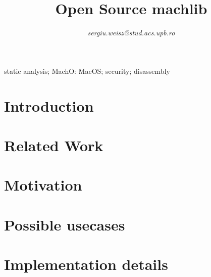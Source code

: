 \documentclass[10pt, conference, compsocconf]{IEEEtran}
\begin{document}
\title{Open Source machlib}

\author{
\emph{sergiu.weisz@stud.acs.upb.ro}
}

\maketitle


\begin{abstract}
  
\end{abstract}

\begin{IEEEkeywords}
static analysis; MachO: MacOS; security; disassembly
\end{IEEEkeywords}

\IEEEpeerreviewmaketitle

\section{Introduction}
\label{sec:intro}


\section{Related Work}
\label{sec:related}


\section{Motivation}
\label{sec:motivation}


\section{Possible usecases}
\label{sec:usecases}


\section{Implementation details}
\label{sec:implementation}

\end{document}

